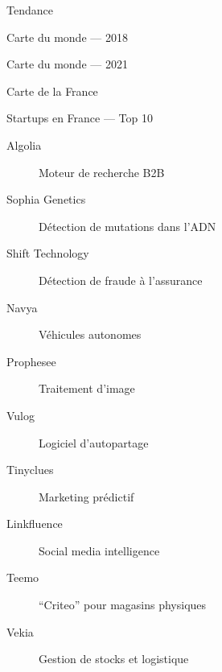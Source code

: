 \begin{frame}{Tendance}
\end{frame}

\begin{frame}{Carte du monde --- 2018}
\end{frame}

\begin{frame}{Carte du monde --- 2021}
\end{frame}

\begin{frame}{Carte de la France}
\end{frame}

\begin{frame}{Startups en France --- Top 10}
  \begin{description}
    \item[Algolia] Moteur de recherche B2B
    \item[Sophia Genetics]  Détection de mutations dans l'ADN
    \item[Shift Technology]  Détection de fraude à l'assurance
    \item[Navya] Véhicules autonomes
    \item[Prophesee] Traitement d'image
    \item[Vulog] Logiciel d'autopartage
    \item[Tinyclues] Marketing prédictif
    \item[Linkfluence] Social media intelligence
    \item[Teemo] ``Criteo'' pour magasins physiques
    \item[Vekia] Gestion de stocks et logistique
  \end{description}
\end{frame}

